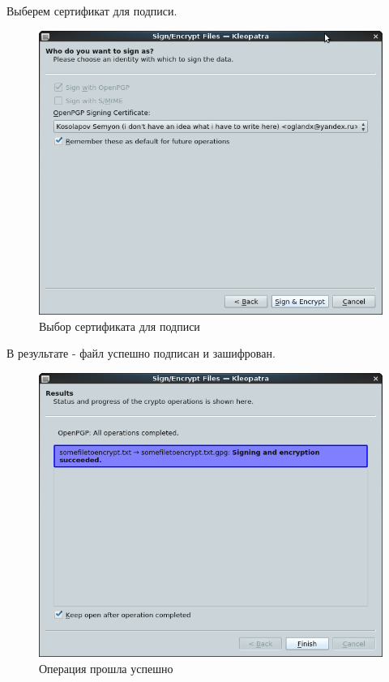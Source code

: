 \documentclass[a4paper]{article}
\begin{document}
Выберем сертификат для подписи.

\begin{figure}[H]
	\begin{center}
		\includegraphics[scale=0.5]{pics/sig_enc_enc.png}
		\caption{Выбор сертификата для подписи} 
		\label{pic:pic_name} %
	\end{center}
\end{figure}

В результате - файл успешно подписан и зашифрован.

\begin{figure}[H]
	\begin{center}
		\includegraphics[scale=0.5]{pics/sig_enc_succeeded.png}
		\caption{Операция прошла успешно} 
		\label{pic:pic_name} %
	\end{center}
\end{figure}
\end{document}
